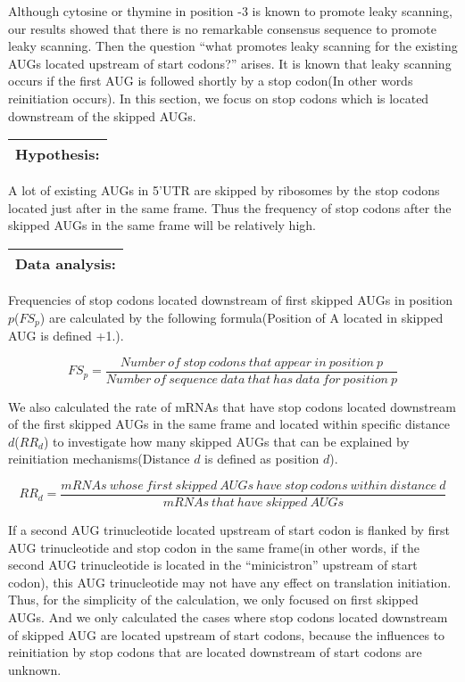 Although cytosine or thymine in position -3 is known to promote leaky
scanning, our results showed that there is no remarkable consensus sequence to
promote leaky scanning. Then the question ``what promotes leaky scanning 
for the existing AUGs located upstream of start codons?'' arises.
It is known that leaky scanning occurs if
the first AUG is followed shortly by a stop codon(In other words
reinitiation occurs). In this section, we
focus on stop codons which is located downstream of the skipped
AUGs. 

\vspace{2ex}
\noindent
\begin{tabular}{|l|}
\hline
Hypothesis:\\
\hline
\end{tabular}

A lot of existing AUGs in 5'UTR are skipped by ribosomes by the stop
codons located just after in the same frame. Thus the frequency of
stop codons after the skipped AUGs in the same frame will be
relatively high. 


\vspace{2ex}
\noindent
\begin{tabular}{|l|}
\hline
Data analysis:\\
\hline
\end{tabular}

Frequencies of stop codons located downstream of first skipped AUGs
in position \(p\)(\(FS_{p}\)) are calculated by the following
formula(Position of A located in skipped AUG is defined +1.). 


\begin{displaymath}
FS_{p} =
\frac{Number\:of\:stop\:codons\:that\:appear\:in\:position\:p}{
Number\:of\:sequence\:data\:that\:has\:data\:for\:position\:p}
\end{displaymath}

We also calculated the rate of mRNAs that have stop codons located
downstream of the first skipped AUGs in the same frame and located
within specific distance \(d\)(\(RR_{d}\)) to investigate how many
skipped AUGs that can be explained by reinitiation mechanisms(Distance
\(d\) is defined as position \(d\)).

\begin{displaymath}
RR_{d} =
\frac{mRNAs\:whose\:first\:skipped\:AUGs\:have\:stop\:codons\:within\:distance\:d}{mRNAs\:that\:have\:skipped\:AUGs} 
\end{displaymath}

If a second AUG trinucleotide located
upstream of start codon is flanked by first AUG trinucleotide and stop 
codon in the same frame(in other words, if the second AUG
trinucleotide is located in the ``minicistron'' upstream of start
codon),  this AUG trinucleotide
may not have any effect on 
translation initiation. Thus, for the simplicity of the calculation, we
only focused on first skipped AUGs.
And we only calculated the cases where stop codons located downstream
of skipped AUG are located upstream of start codons, because the
influences to reinitiation by stop codons 
that are located downstream of start codons are unknown.


